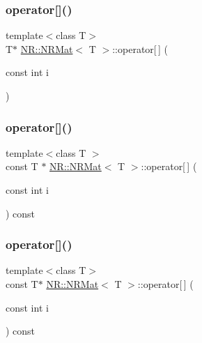 \mbox{\label{classNR_1_1NRMat_a387bf9be7d9606ea60e697c31c73df53}} 
\subsubsection{\texorpdfstring{operator[]()}{operator[]()}\hspace{0.1cm}{\footnotesize\ttfamily [3/6]}}
{\footnotesize\ttfamily template$<$class T$>$ \\
T$\ast$ \mbox{\hyperlink{classNR_1_1NRMat}{N\+R\+::\+N\+R\+Mat}}$<$ T $>$\+::operator\mbox{[}$\,$\mbox{]} (\begin{DoxyParamCaption}\item[{const int}]{i }\end{DoxyParamCaption})\hspace{0.3cm}{\ttfamily [inline]}}

\mbox{\label{classNR_1_1NRMat_aa45509152cfe7c8214521e8c5a98733a}} 
\subsubsection{\texorpdfstring{operator[]()}{operator[]()}\hspace{0.1cm}{\footnotesize\ttfamily [4/6]}}
{\footnotesize\ttfamily template$<$class T $>$ \\
const T $\ast$ \mbox{\hyperlink{classNR_1_1NRMat}{N\+R\+::\+N\+R\+Mat}}$<$ T $>$\+::operator\mbox{[}$\,$\mbox{]} (\begin{DoxyParamCaption}\item[{const int}]{i }\end{DoxyParamCaption}) const\hspace{0.3cm}{\ttfamily [inline]}}

\mbox{\label{classNR_1_1NRMat_a260aec593a5ef0c2166f6f4816ddfd2c}} 
\subsubsection{\texorpdfstring{operator[]()}{operator[]()}\hspace{0.1cm}{\footnotesize\ttfamily [5/6]}}
{\footnotesize\ttfamily template$<$class T$>$ \\
const T$\ast$ \mbox{\hyperlink{classNR_1_1NRMat}{N\+R\+::\+N\+R\+Mat}}$<$ T $>$\+::operator\mbox{[}$\,$\mbox{]} (\begin{DoxyParamCaption}\item[{const int}]{i }\end{DoxyParamCaption}) const\hspace{0.3cm}{\ttfamily [inline]}}

